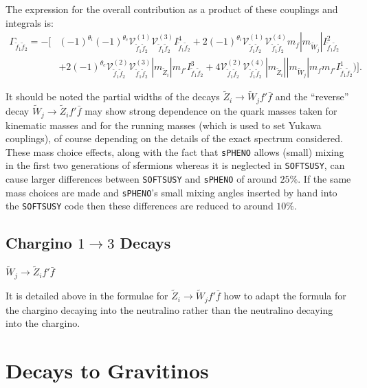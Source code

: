 \documentclass[final,3p,times,pdflatex]{elsarticle}
\begin{document}
The expression for the overall contribution as a product of these couplings and integrals is:
\begin{equation} 
\begin{aligned}
\Gamma_{\tilde{f}_1 \tilde{f}_2} = - \Big[ & (-1)^{\theta_i}(-1)^{\theta_c}\mathcal{V}_{\tilde{f}_1 \tilde{f}_2}^{(1)} \mathcal{V}_{\tilde{f}_1 \tilde{f}_2}^{(3)} I_{\tilde{f}_1 \tilde{f}_2}^{4} + 2(-1)^{\theta_i}\mathcal{V}_{\tilde{f}_1 \tilde{f}_2}^{(1)} \mathcal{V}_{\tilde{f}_1 \tilde{f}_2}^{(4)} m_{f} |m_{\tilde{W}_j}| I_{\tilde{f}_1 \tilde{f}_2}^{2} \\ & + 2(-1)^{\theta_c} \mathcal{V}_{\tilde{f}_1 \tilde{f}_2}^{(2)} \mathcal{V}_{\tilde{f}_1 \tilde{f}_2}^{(3)} |m_{\tilde{Z}_i}| m_{f'} I_{\tilde{f}_1 \tilde{f}_2}^{3} + 4 \mathcal{V}_{\tilde{f}_1 \tilde{f}_2}^{(2)} \mathcal{V}_{\tilde{f}_1 \tilde{f}_2}^{(4)} |m_{\tilde{Z}_i}||m_{\tilde{W}_j}|m_{f} m_{f'} I_{\tilde{f}_1 \tilde{f}_2}^{1}) \Big].
\end{aligned}
\end{equation}

It should be noted the partial widths of the decays $\tilde{Z}_i \rightarrow \tilde{W}_j f' \bar{f}$ and the ``reverse'' decay $\tilde{W}_j \rightarrow \tilde{Z}_i f' \bar{f}$ may show strong dependence on the quark masses taken for kinematic masses and for the running masses (which is used to set Yukawa couplings), of course depending on the details of the exact spectrum considered. These mass choice effects, along with the fact that {\tt sPHENO} allows (small) mixing in the first two generations of sfermions whereas it is neglected in {\tt SOFTSUSY}, can cause larger differences between {\tt SOFTSUSY} and {\tt sPHENO} of around $25\%$. If the same mass choices are made and {\tt sPHENO}'s small mixing angles inserted by hand into the {\tt SOFTSUSY} code then these differences are reduced to around $10\%$.

\subsection{Chargino $1 \rightarrow 3$ Decays}

\textbf{\underline{$\tilde{W}_j \rightarrow \tilde{Z}_i f' \bar{f}$}}

It is detailed above in the formulae for $\tilde{Z}_i \rightarrow \tilde{W}_j f' \bar{f}$ how to adapt the formula for the chargino decaying into the neutralino rather than the neutralino decaying into the chargino.

\section{Decays to Gravitinos} \label{appendix:gravitinos}
\end{document}
